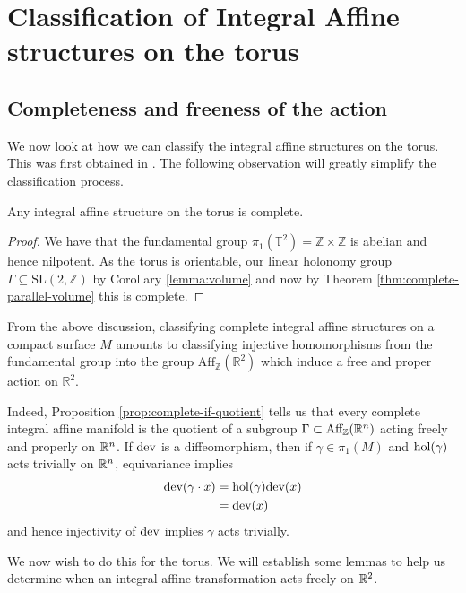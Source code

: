 \section{Classification of Integral Affine structures on the torus}
\subsection{Completeness and freeness of the action}
We now look at how we can classify the integral affine structures on the torus.
This was first obtained in \cite{Sepe2010}. The following observation will
greatly simplify the classification process.

\begin{lemma}\label{lemma:torus-complete}
    Any integral affine structure on the torus is complete.
\end{lemma}
\begin{proof}
    We have that the fundamental group $\pi_1(\mathbb{T}^2) = \mathbb{Z} \times \mathbb{Z}$ is abelian and hence nilpotent. As the torus is orientable,
    our linear holonomy group $\Gamma \subseteq \text{SL}(2, \mathbb{Z})$ by Corollary \ref{lemma:volume} and now by Theorem \ref{thm:complete-parallel-volume} this is complete.
\end{proof}

From the above discussion, classifying complete integral affine structures on a
compact surface $M$ amounts to classifying injective homomorphisms from the
fundamental group into the group $\text{Aff}_{\mathbb{Z}}(\mathbb{R}^2)$ which
induce a free and proper action on $\mathbb{R}^2$.

Indeed, Proposition \ref{prop:complete-if-quotient} tells us that every
complete integral affine manifold is the quotient of a subgroup $\Gamma \subset
    \text{Aff}_{\mathbb{Z}} (\mathbb{R}^n)$ acting freely and properly on $\mathbb{R}^n$. If $\text{dev}$ is a
diffeomorphism, then if $\gamma \in \pi_1(M)$ and $\text{hol}(\gamma)$ acts trivially
on $\mathbb{R}^n$, equivariance implies
\begin{align*}
    \text{dev}(\gamma \cdot x) & = \text{hol}(\gamma)\text{dev}(x) \\
                         & = \text{dev}(x)
\end{align*}
and hence injectivity of $\text{dev}$ implies $\gamma$ acts trivially.

We now wish to do this for the torus. We will establish some lemmas to help us
determine when an integral affine transformation acts freely on $\mathbb{R}^2$.

